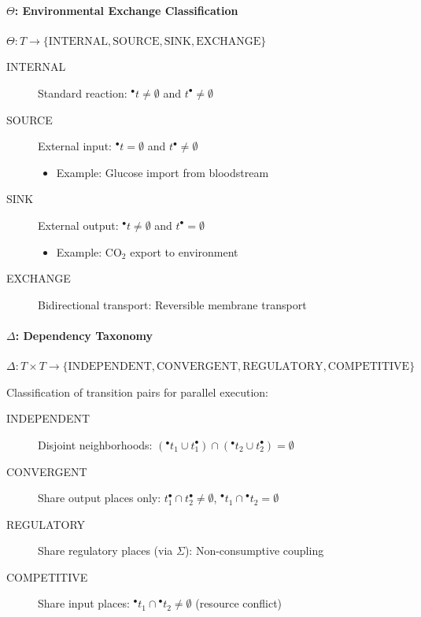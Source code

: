 \paragraph{$\Theta$: Environmental Exchange Classification}
$\Theta: T \to \{\text{INTERNAL}, \text{SOURCE}, \text{SINK}, \text{EXCHANGE}\}$

\begin{description}
    \item[INTERNAL] Standard reaction: ${}^\bullet t \neq \emptyset$ and $t^\bullet \neq \emptyset$
    \item[SOURCE] External input: ${}^\bullet t = \emptyset$ and $t^\bullet \neq \emptyset$
        \begin{itemize}
            \item Example: Glucose import from bloodstream
        \end{itemize}
    \item[SINK] External output: ${}^\bullet t \neq \emptyset$ and $t^\bullet = \emptyset$
        \begin{itemize}
            \item Example: CO$_2$ export to environment
        \end{itemize}
    \item[EXCHANGE] Bidirectional transport: Reversible membrane transport
\end{description}

\paragraph{$\Delta$: Dependency Taxonomy}
$\Delta: T \times T \to \{\text{INDEPENDENT}, \text{CONVERGENT}, \text{REGULATORY}, \text{COMPETITIVE}\}$

Classification of transition pairs for parallel execution:
\begin{description}
    \item[INDEPENDENT] Disjoint neighborhoods: $({}^\bullet t_1 \cup t_1^\bullet) \cap ({}^\bullet t_2 \cup t_2^\bullet) = \emptyset$
    \item[CONVERGENT] Share output places only: $t_1^\bullet \cap t_2^\bullet \neq \emptyset$, ${}^\bullet t_1 \cap {}^\bullet t_2 = \emptyset$
    \item[REGULATORY] Share regulatory places (via $\Sigma$): Non-consumptive coupling
    \item[COMPETITIVE] Share input places: ${}^\bullet t_1 \cap {}^\bullet t_2 \neq \emptyset$ (resource conflict)
\end{description}

